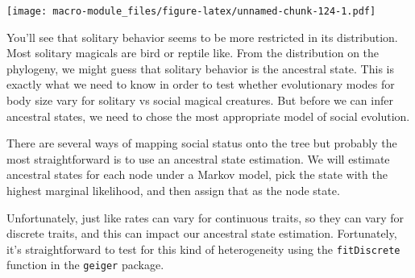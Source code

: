 \documentclass[]{book}
\newenvironment{Shaded}{\begin{snugshade}}{\end{snugshade}}
\newcommand{\KeywordTok}[1]{\textcolor[rgb]{0.13,0.29,0.53}{\textbf{{#1}}}}
\newcommand{\DataTypeTok}[1]{\textcolor[rgb]{0.13,0.29,0.53}{{#1}}}
\newcommand{\DecValTok}[1]{\textcolor[rgb]{0.00,0.00,0.81}{{#1}}}
\newcommand{\FloatTok}[1]{\textcolor[rgb]{0.00,0.00,0.81}{{#1}}}
\newcommand{\StringTok}[1]{\textcolor[rgb]{0.31,0.60,0.02}{{#1}}}
\newcommand{\CommentTok}[1]{\textcolor[rgb]{0.56,0.35,0.01}{\textit{{#1}}}}
\newcommand{\NormalTok}[1]{{#1}}
\begin{document}
\begin{Shaded}
\end{Shaded}

\texttt{[image: macro-module\_files/figure-latex/unnamed-chunk-124-1.pdf]}

You'll see that solitary behavior seems to be more restricted in its
distribution. Most solitary magicals are bird or reptile like. From the
distribution on the phylogeny, we might guess that solitary behavior is
the ancestral state. This is exactly what we need to know in order to
test whether evolutionary modes for body size vary for solitary vs
social magical creatures. But before we can infer ancestral states, we
need to chose the most appropriate model of social evolution.

There are several ways of mapping social status onto the tree but
probably the most straightforward is to use an ancestral state
estimation. We will estimate ancestral states for each node under a
Markov model, pick the state with the highest marginal likelihood, and
then assign that as the node state.

Unfortunately, just like rates can vary for continuous traits, so they
can vary for discrete traits, and this can impact our ancestral state
estimation. Fortunately, it's straightforward to test for this kind of
heterogeneity using the \texttt{fitDiscrete} function in the
\texttt{geiger} package.
\end{document}
